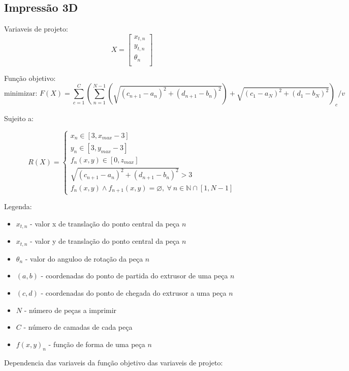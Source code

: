 \documentclass[11pt,a4paper]{article}
\begin{document}
\subsection{Impressão 3D}

Variaveis de projeto:
$$ X = 
\begin{bmatrix}
    x_{t,n} \\
    y_{t,n} \\
    \theta _n \\
\end{bmatrix}
$$

Função objetivo: 
$$
\text{minimizar: }  
F(X) =
\displaystyle\sum_{c=1}^{C}
\left( 
\displaystyle\sum_{n=1}^{N-1} 
\left( 
\sqrt{ \left( c_{n+1} - a_n \right)^2 + \left( d_{n+1} - b_n \right)^2} \right)
 + \sqrt{ \left( c_1 - a_N \right)^2 + \left( d_1 - b_N \right)^2}
\right)_c / v
$$

Sujeito a:

$$
R(X) = \left
\{ \begin{matrix} 
x_n \in [3, x_{max}-3] \\
y_n \in [3, y_{max}-3] \\
f_n(x,y) \in [0, z_{max}] \\
\sqrt{ \left( c_{n+1} - a_n \right)^2 + \left( d_{n+1} - b_n \right)^2} > 3 \\
f_n(x,y) \land f_{n+1}(x,y) = \varnothing,\ \forall\ n \in \mathbb{N} \cap [1,N-1]
\end{matrix} 
\right.
$$

Legenda:
\begin{itemize}
\item $x_{t,n}$ - valor x de translação do ponto central da peça $n$
\item $x_{t,n}$ - valor y de translação do ponto central da peça $n$
\item $\theta_{n}$ - valor do anguloo de rotação da peça $n$
\item $(a,b)$ - coordenadas do ponto de partida do extrusor de uma peça $n$
\item $(c,d)$ - coordenadas do ponto de chegada do extrusor a uma peça $n$
\item $N$ - número de peças a imprimir
\item $C$ - número de camadas de cada peça
\item $f(x,y)_n$ - função de forma de uma peça $n$
\end{itemize}

Dependencia das variaveis da função objetivo das variaveis de projeto:
\end{document}
